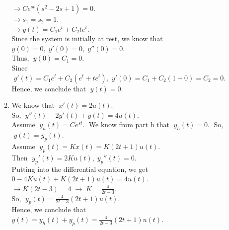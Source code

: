 \documentclass[10pt,a4paper, margin=1in]{article}
\begin{document}
\begin{enumerate}
\begin{enumerate}
    $\rightarrow Ce^{st}(s^2-2s+1) = 0.$\vspace{0.3cm}\\
    $\rightarrow s_1 = s_2 = 1.$\vspace{0.3cm}\\
    $\rightarrow y(t) = C_1e^t + C_2te^t.$\vspace{0.3cm}\\
    Since the system is initially at rest, we know that\vspace{0.3cm}\\
    $y(0) = 0, \; y'(0) = 0, \; y''(0) = 0.$\vspace{0.3cm}\\
    Thus, $\; y(0) = C_1 = 0.$\vspace{0.3cm}\\
    Since $\; y'(t) = C_1e^t + C_2(e^t + te^t), \; y'(0) = C_1 + C_2(1+0) = C_2 = 0.$\vspace{0.3cm}\\
    Hence, we conclude that $\; y(t) = 0.$\vspace{0.3cm}\\
	\item %
    We know that $\; x'(t) = 2u(t).$\vspace{0.3cm}\\
    So, $\; y''(t) - 2y'(t) + y(t) = 4u(t).$\vspace{0.3cm}\\
    Assume $\; y_h(t) = Ce^{st}.\;$ We know from part b that $\;y_h(t) = 0.\;$ So, $\; y(t) = y_p(t).$\vspace{0.3cm}\\
    Assume $\; y_p(t) = Kx(t) = K(2t+1)u(t).$\vspace{0.3cm}\\
    Then $\; y_p'(t) = 2Ku(t), \; y_p''(t) = 0.$\vspace{0.3cm}\\
    Putting into the differential equation, we get\vspace{0.3cm}\\
    $0 - 4Ku(t) + K(2t+1)u(t) = 4u(t). $\vspace{0.3cm}\\
    $\rightarrow K(2t-3) = 4 \; \rightarrow \; K = \frac{4}{2t-3}.$\vspace{0.3cm}\\
    So, $\; y_p(t) = \frac{4}{2t-3}(2t+1)u(t).$\vspace{0.3cm}\\
    Hence, we conclude that\vspace{0.3cm}\\
    $y(t) = y_h(t) + y_p(t) = \frac{4}{2t-3}(2t+1)u(t).$\vspace{0.3cm}\\
    \end{enumerate}


\end{enumerate}
\end{document}
